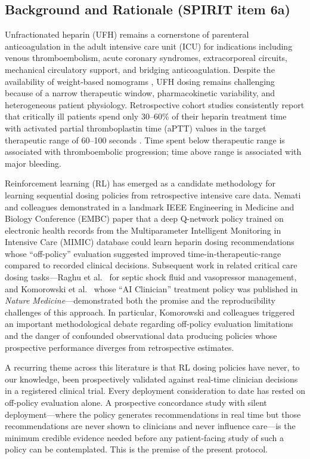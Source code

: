 \documentclass[11pt]{article}
\begin{document}
\subsection{Background and Rationale (SPIRIT item 6a)}

Unfractionated heparin (UFH) remains a cornerstone of parenteral anticoagulation in the adult intensive care unit (ICU) for indications including venous thromboembolism, acute coronary syndromes, extracorporeal circuits, mechanical circulatory support, and bridging anticoagulation. Despite the availability of weight-based nomograms \citep{raschke1993}, UFH dosing remains challenging because of a narrow therapeutic window, pharmacokinetic variability, and heterogeneous patient physiology. Retrospective cohort studies consistently report that critically ill patients spend only 30--60\% of their heparin treatment time with activated partial thromboplastin time (aPTT) values in the target therapeutic range of 60--100 seconds \citep{nemati2016, raghu2017}. Time spent below therapeutic range is associated with thromboembolic progression; time above range is associated with major bleeding.

Reinforcement learning (RL) has emerged as a candidate methodology for learning sequential dosing policies from retrospective intensive care data. Nemati and colleagues \citep{nemati2016} demonstrated in a landmark IEEE Engineering in Medicine and Biology Conference (EMBC) paper that a deep Q-network policy trained on electronic health records from the Multiparameter Intelligent Monitoring in Intensive Care (MIMIC) database could learn heparin dosing recommendations whose ``off-policy'' evaluation suggested improved time-in-therapeutic-range compared to recorded clinical decisions. Subsequent work in related critical care dosing tasks---Raghu et al.\ \citep{raghu2017} for septic shock fluid and vasopressor management, and Komorowski et al.\ \citep{komorowski2018} whose ``AI Clinician'' treatment policy was published in \emph{Nature Medicine}---demonstrated both the promise and the reproducibility challenges of this approach. In particular, Komorowski and colleagues triggered an important methodological debate regarding off-policy evaluation limitations and the danger of confounded observational data producing policies whose prospective performance diverges from retrospective estimates.

A recurring theme across this literature is that RL dosing policies have never, to our knowledge, been prospectively validated against real-time clinician decisions in a registered clinical trial. Every deployment consideration to date has rested on off-policy evaluation alone. A prospective concordance study with silent deployment---where the policy generates recommendations in real time but those recommendations are never shown to clinicians and never influence care---is the minimum credible evidence needed before any patient-facing study of such a policy can be contemplated. This is the premise of the present protocol.
\end{document}
